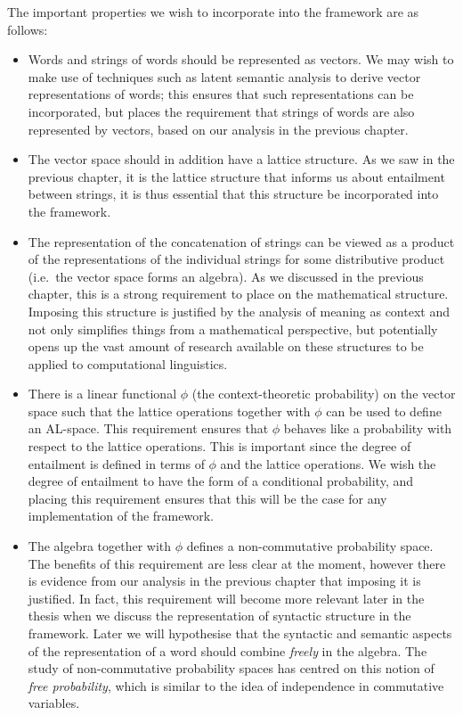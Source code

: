 The important properties we wish to incorporate into the framework are as follows:
\begin{itemize}
\item Words and strings of words should be represented as vectors. We may wish to make use of techniques such as latent semantic analysis to derive vector representations of words; this ensures that such representations can be incorporated, but places the requirement that strings of words are also represented by vectors, based on our analysis in the previous chapter.
\item The vector space should in addition have a lattice structure. As we saw in the previous chapter, it is the lattice structure that informs us about entailment between strings, it is thus essential that this structure be incorporated into the framework.
\item The representation of the concatenation of strings can be viewed as a product of the representations of the individual strings for some distributive product (i.e.~the vector space forms an algebra). As we discussed in the previous chapter, this is a strong requirement to place on the mathematical structure. Imposing this structure is justified by the analysis of meaning as context and not only simplifies things from a mathematical perspective, but potentially opens up the vast amount of research available on these structures to be applied to computational linguistics.
\item There is a linear functional $\phi$ (the context-theoretic probability) on the vector space such that the lattice operations together with $\phi$ can be used to define an AL-space. This requirement ensures that $\phi$ behaves like a probability with respect to the lattice operations. This is important since the degree of entailment is defined in terms of $\phi$ and the lattice operations. We wish the degree of entailment to have the form of a conditional probability, and placing this requirement ensures that this will be the case for any implementation of the framework.
\item The algebra together with $\phi$ defines a non-commutative probability space. The benefits of this requirement are less clear at the moment, however there is evidence from our analysis in the previous chapter that imposing it is justified. In fact, this requirement will become more relevant later in the thesis when we discuss the representation of syntactic structure in the framework. Later we will hypothesise that the syntactic and semantic aspects of the representation of a word should combine \emph{freely} in the algebra. The study of non-commutative probability spaces has centred on this notion of \emph{free probability}, which is similar to the idea of independence in commutative variables.
\end{itemize}
